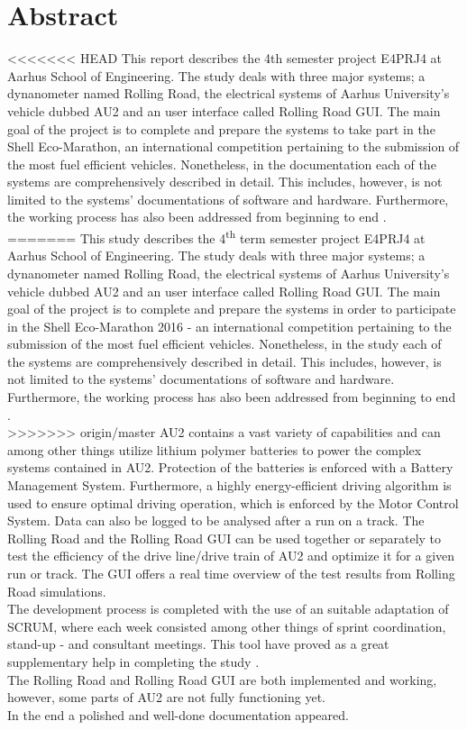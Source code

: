 \chapter{Abstract}
<<<<<<< HEAD
This report describes the 4th semester project E4PRJ4 at Aarhus School of Engineering. The study deals with three major systems; a dynanometer named Rolling Road, the electrical systems of Aarhus University's vehicle dubbed AU2 and an user interface called Rolling Road GUI. The main goal of the project is to complete and prepare the systems to take part in the Shell Eco-Marathon, an international competition pertaining to the submission of the most fuel efficient vehicles. Nonetheless, in the documentation each of the systems are comprehensively described in detail. This includes, however, is not limited to the systems' documentations of software and hardware. Furthermore, the working process has also been addressed from beginning to end . \\
=======
This study describes the 4\textsuperscript{th} term semester project E4PRJ4 at Aarhus School of Engineering. The study deals with three major systems; a dynanometer named Rolling Road, the electrical systems of Aarhus University's vehicle dubbed AU2 and an user interface called Rolling Road GUI. The main goal of the project is to complete and prepare the systems in order to participate in the Shell Eco-Marathon 2016 - an international competition pertaining to the submission of the most fuel efficient vehicles. Nonetheless, in the study  each of the systems are comprehensively described in detail. This includes, however, is not limited to the systems' documentations of  software and hardware. Furthermore, the working process has also been addressed from beginning to end . \\
>>>>>>> origin/master
AU2 contains a vast variety of capabilities and can among other things utilize lithium polymer batteries to power the complex systems contained in AU2.
Protection of the batteries is enforced with a Battery Management System. Furthermore, a highly energy-efficient driving algorithm is used to ensure optimal driving operation, which is enforced by the Motor Control System. Data can also be logged to be analysed after a run on a track.
The Rolling Road and the Rolling Road GUI can be used together or separately to test the efficiency of the drive line/drive train of AU2 and optimize it for a given run or track. The GUI offers a real time overview of the test results from Rolling Road simulations.\\

The development process is completed with the use of an suitable adaptation of SCRUM, where each week consisted among other things of sprint coordination, stand-up - and consultant meetings. This tool have proved as a great
supplementary help in completing the study .\\
The Rolling Road and Rolling Road GUI are both implemented and working, however, some parts of AU2 are not fully functioning yet. \\

In the end a polished and well-done documentation appeared.